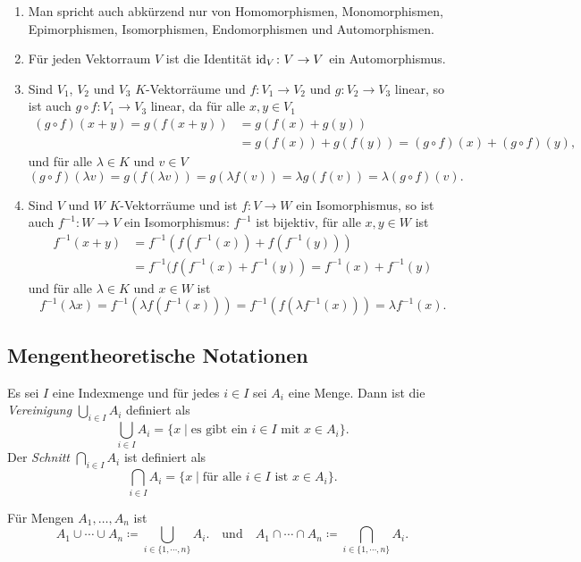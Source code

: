 \begin{bem}
 \begin{enumerate}[leftmargin=*]
  \item
   Man spricht auch abkürzend nur von Homomorphismen, Monomorphismen, Epimorphismen, Isomorphismen, Endomorphismen und Automorphismen.
  \item
   Für jeden Vektorraum $V$ ist die Identität $\mathrm{id}_V \colon V \to V$ ein Automorphismus.
  \item
   Sind $V_1$, $V_2$ und $V_3$ $K$-Vektorräume und $f \colon V_1 \to V_2$ und $g \colon V_2 \to V_3$ linear, so ist auch $g \circ f \colon V_1 \to V_3$ linear, da für alle $x,y \in V_1$
   \begin{align*}
    (g \circ f)(x+y)
    = g(f(x+y))
    &= g(f(x)+g(y)) \\
    &= g(f(x)) + g(f(y))
    = (g \circ f)(x) + (g \circ f)(y),
   \end{align*}
   und für alle $\lambda \in K$ und $v \in V$
   \[
    (g \circ f)(\lambda v)
    = g(f(\lambda v))
    = g(\lambda f(v))
    = \lambda g(f(v))
    = \lambda (g \circ f)(v).
   \]
  \item
   Sind $V$ und $W$ $K$-Vektorräume und ist $f \colon V \to W$ ein Isomorphismus, so ist auch $f^{-1} \colon W \to V$ ein Isomorphismus: $f^{-1}$ ist bijektiv, für alle $x,y \in W$ ist
   \begin{align*}
    f^{-1}(x+y)
    &= f^{-1}( f(f^{-1}(x)) + f(f^{-1}(y)) ) \\
    &= f^{-1}(f( f^{-1}(x) + f^{-1}(y) )
    = f^{-1}(x) + f^{-1}(y)
   \end{align*}
   und für alle $\lambda \in K$ und $x \in W$ ist
   \[
    f^{-1}(\lambda x)
    = f^{-1}(\lambda f(f^{-1}(x)) )
    = f^{-1}(f( \lambda f^{-1}(x)))
    = \lambda f^{-1}(x).
   \]
 \end{enumerate}
\end{bem}





\subsection{Mengentheoretische Notationen}


\begin{defi}
 Es sei $I$ eine Indexmenge und für jedes $i \in I$ sei $A_i$ eine Menge. Dann ist die \emph{Vereinigung} $\bigcup_{i \in I} A_i$ definiert als
 \[
  \bigcup_{i \in I} A_i
  = \{x \mid \text{es gibt ein $i \in I$ mit $x \in A_i$}\}.
 \]
 Der \emph{Schnitt} $\bigcap_{i \in I} A_i$ ist definiert als
 \[
  \bigcap_{i \in I} A_i
  = \{x \mid \text{für alle $i \in I$ ist $x \in A_i$}\}.
 \]
 
 Für Mengen $A_1, \dotsc, A_n$ ist
 \[
  A_1 \cup \dotsb \cup A_n \coloneqq \bigcup_{i \in \{1, \dotsb, n\}} A_i.
  \quad\text{und}\quad
  A_1 \cap \dotsb \cap A_n \coloneqq \bigcap_{i \in \{1, \dotsb, n\}} A_i.
 \]
\end{defi}


